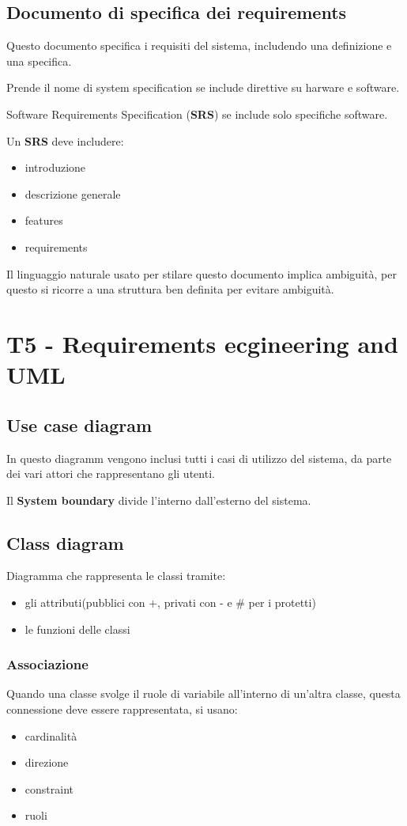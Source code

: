 \documentclass{article}
\begin{document}
\subsection{Documento di specifica dei requirements}

Questo documento specifica i requisiti del sistema, includendo una definizione
e una specifica.

Prende il nome di system specification se include direttive su harware e software.

Software Requirements Specification (\textbf{SRS}) se include solo specifiche software.


Un \textbf{SRS} deve includere:
\begin{itemize}
    \item introduzione
    \item descrizione generale
    \item features
    \item requirements
\end{itemize}

Il linguaggio naturale usato per stilare questo documento implica ambiguità,
per questo si ricorre a una struttura ben definita per evitare ambiguità.

\section{T5 - Requirements ecgineering and UML}
\subsection{Use case diagram}
In questo diagramm vengono inclusi tutti i casi di utilizzo del sistema,
da parte dei vari attori che rappresentano gli utenti.

Il \textbf{System boundary} divide l'interno dall'esterno del sistema.

\subsection{Class diagram}

Diagramma che rappresenta le classi tramite:
\begin{itemize}
    \item gli attributi(pubblici con +, privati con - e \# per i protetti)
    \item le funzioni delle classi
\end{itemize}

\subsubsection{Associazione}
Quando una classe svolge il ruole di variabile all'interno di un'altra classe,
questa connessione deve essere rappresentata, si usano:
\begin{itemize}
    \item cardinalità
    \item direzione
    \item constraint
    \item ruoli
\end{itemize}
\end{document}

